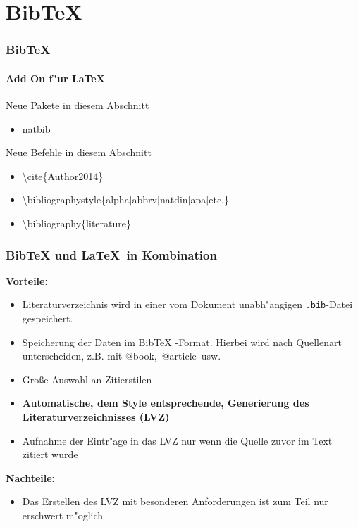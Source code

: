 \section{BibTeX}
\begin{frame}
\frametitle{BibTeX}
\framesubtitle{Add On f"ur \LaTeX}
\begin{exampleblock}{Neue Pakete in diesem Abschnitt}
\begin{itemize}
\item natbib
\end{itemize}
\end{exampleblock}

\begin{block}{Neue Befehle in diesem Abschnitt}
\begin{itemize}
\item \color{nounibaredI}\textbackslash cite\color{black}\{Author2014\}
\item \color{nounibaredI}\textbackslash bibliographystyle\color{black}\{alpha$\mid$abbrv$\mid$natdin$\mid$apa$\mid$etc.\}
\item \color{nounibaredI}\textbackslash bibliography\color{black}\{literature\}
\end{itemize}
\end{block}
\end{frame}


\begin{frame}
\frametitle{BibTeX und \LaTeX ~in Kombination}
\textbf{Vorteile:}
\begin{itemize}
\item Literaturverzeichnis wird in einer vom Dokument unabh"angigen \texttt{.bib}-Datei gespeichert.
\item Speicherung der Daten im BibTeX -Format. Hierbei wird nach Quellenart unterscheiden, z.B. mit \color{nounibaredI}$@$book\color{black},~\color{nounibaredI}$@$article\color{black}~usw.
\item Gro\ss e Auswahl an Zitierstilen
\item \textbf{Automatische, dem Style entsprechende, Generierung des Literaturverzeichnisses (LVZ)}
\item Aufnahme der Eintr"age in das LVZ nur wenn die Quelle zuvor im Text zitiert wurde
\end{itemize}
\textbf{Nachteile:}
\begin{itemize}
\item Das Erstellen des LVZ mit besonderen Anforderungen ist zum Teil nur erschwert m"oglich
\end{itemize}
\end{frame}

